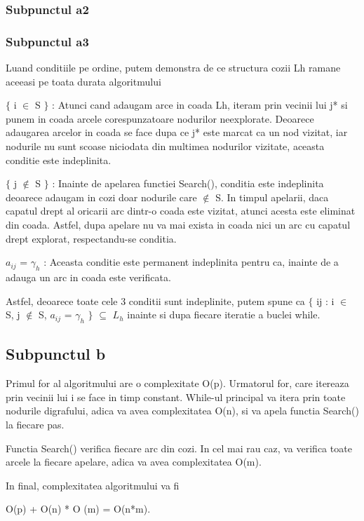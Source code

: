 \documentclass{article}
\begin{document}
\subsubsection*{\fontsize{14}{20}\selectfont Subpunctul a2}
{\fontsize{14}{16}\selectfont

}

\subsubsection*{\fontsize{14}{20}\selectfont Subpunctul a3}
{\fontsize{14}{16}\selectfont
Luand conditiile pe ordine, putem demonstra de ce structura cozii Lh ramane aceeasi pe toata durata algoritmului

$\lbrace$ i $\in$ S $\rbrace$ : Atunci cand adaugam arce in coada Lh, iteram prin vecinii lui j* si punem in coada arcele corespunzatoare nodurilor neexplorate. Deoarece adaugarea arcelor in coada se face dupa ce j* este marcat ca un nod vizitat, iar nodurile nu sunt scoase niciodata din multimea nodurilor vizitate, aceasta conditie este indeplinita.

$\lbrace$ j $\notin$ S $\rbrace$ : Inainte de apelarea functiei Search(), conditia este indeplinita deoarece adaugam in cozi doar nodurile care $\notin$ S. In timpul apelarii, daca capatul drept al oricarii arc dintr-o coada este vizitat, atunci acesta este eliminat din coada. Astfel, dupa apelare nu va mai exista in coada nici un arc cu capatul drept explorat, respectandu-se conditia.

$a_{ij}$ = $\gamma_h$ : Aceasta conditie este permanent indeplinita pentru ca, inainte de a adauga un arc in coada este verificata.

Astfel, deoarece toate cele 3 conditii sunt indeplinite, putem spune ca $\lbrace$ ij : i $\in$ S, j $\notin$ S, $a_{ij}$ = $\gamma_h$ $\rbrace$ $\subseteq$ $L_h$ inainte si dupa fiecare iteratie a buclei while.

}

\subsection*{\fontsize{16}{30}\selectfont Subpunctul b}
{\fontsize{14}{16}\selectfont
Primul for al algoritmului are o complexitate O(p). Urmatorul for, care itereaza prin vecinii lui i se face in timp constant. While-ul principal va itera prin toate nodurile digrafului, adica va avea complexitatea O(n), si va apela functia Search() la fiecare pas.

Functia Search() verifica fiecare arc din cozi. In cel mai rau caz, va verifica toate arcele la fiecare apelare, adica va avea complexitatea O(m).

In final, complexitatea algoritmului va fi  \\ \centerline {O(p) + O(n) * O (m) = O(n*m).}
}
\end{document}

